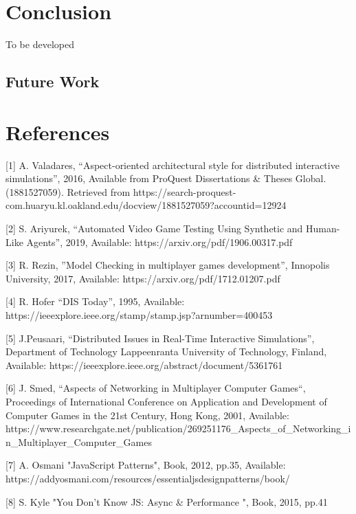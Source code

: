 \documentclass[conference]{IEEEtran}
\begin{document}
\section{Conclusion}

To be developed 

\subsection{Future Work}

\section{References}
[1] A. Valadares, “Aspect-oriented architectural style for distributed interactive simulations”, 2016, 
Available from ProQuest Dissertations \& Theses Global. (1881527059). 
Retrieved from https://search-proquest-com.huaryu.kl.oakland.edu/docview/1881527059?accountid=12924

[2] S. Ariyurek, “Automated Video Game Testing Using
Synthetic and Human-Like Agents”, 2019, Available: https://arxiv.org/pdf/1906.00317.pdf
	
[3] R. Rezin, ”Model Checking in multiplayer games development”, Innopolis University, 
2017, Available: https://arxiv.org/pdf/1712.01207.pdf

[4] R. Hofer “DIS Today”, 1995, Available:
https://ieeexplore.ieee.org/stamp/stamp.jsp?arnumber=400453

[5] J.Peusaari, “Distributed Issues in Real-Time Interactive Simulations”, Department of Technology Lappeenranta University of Technology, Finland,
 Available: https://ieeexplore.ieee.org/abstract/document/5361761
 
[6] J. Smed, “Aspects of Networking in Multiplayer Computer Games“, Proceedings of International Conference on Application and Development of Computer Games in the 21st Century, Hong Kong, 2001,
Available: https://www.researchgate.net/publication/269251176\_Aspects\_of\_Networking\_in\_Multiplayer\_Computer\_Games

[7] A. Osmani "JavaScript Patterns", Book, 2012, pp.35, Available: https://addyosmani.com/resources/essentialjsdesignpatterns/book/

[8] S. Kyle "You Don't Know JS: Async \& Performance ", Book, 2015, pp.41
\end{document}
